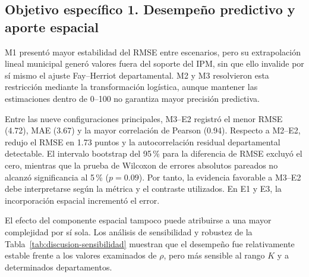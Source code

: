 \subsection*{Objetivo específico 1. Desempeño predictivo y aporte espacial}

M1 presentó mayor estabilidad del RMSE entre escenarios, pero su extrapolación lineal municipal generó valores fuera del soporte del IPM, sin que ello invalide por sí mismo el ajuste Fay--Herriot departamental. M2 y M3 resolvieron esta restricción mediante la transformación logística, aunque mantener las estimaciones dentro de 0--100 no garantiza mayor precisión predictiva.

Entre las nueve configuraciones principales, M3--E2 registró el menor RMSE (4.72), MAE (3.67) y la mayor correlación de Pearson (0.94). Respecto a M2--E2, redujo el RMSE en 1.73 puntos y la autocorrelación residual departamental detectable. El intervalo bootstrap del 95\,\% para la diferencia de RMSE excluyó el cero, mientras que la prueba de Wilcoxon de errores absolutos pareados no alcanzó significancia al 5\,\% ($p=0.09$). Por tanto, la evidencia favorable a M3--E2 debe interpretarse según la métrica y el contraste utilizados. En E1 y E3, la incorporación espacial incrementó el error.

El efecto del componente espacial tampoco puede atribuirse a una mayor complejidad por sí sola. Los análisis de sensibilidad y robustez de la Tabla~\ref{tab:discusion-sensibilidad} muestran que el desempeño fue relativamente estable frente a los valores examinados de $\rho$, pero más sensible al rango $K$ y a determinados departamentos.

